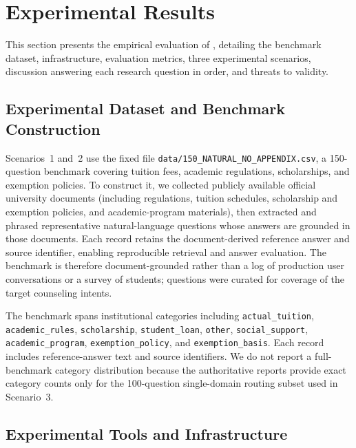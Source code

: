 \section{Experimental Results}
\label{sec:exp}

This section presents the empirical evaluation of \system{}, detailing the benchmark dataset, infrastructure, evaluation metrics, three experimental scenarios, discussion answering each research question in order, and threats to validity.

\subsection{Experimental Dataset and Benchmark Construction}
\label{sec:dataset}

Scenarios~1 and~2 use the fixed file \texttt{data/150\_NATURAL\_NO\_APPENDIX.csv}, a 150-question benchmark covering tuition fees, academic regulations, scholarships, and exemption policies. To construct it, we collected publicly available official university documents (including regulations, tuition schedules, scholarship and exemption policies, and academic-program materials), then extracted and phrased representative natural-language questions whose answers are grounded in those documents. Each record retains the document-derived reference answer and source identifier, enabling reproducible retrieval and answer evaluation. The benchmark is therefore document-grounded rather than a log of production user conversations or a survey of students; questions were curated for coverage of the target counseling intents.

The benchmark spans institutional categories including \texttt{actual\_tuition}, \texttt{academic\_rules}, \texttt{scholarship}, \texttt{student\_loan}, \texttt{other}, \texttt{social\_support}, \texttt{academic\_program}, \texttt{exemption\_policy}, and \texttt{exemption\_basis}. Each record includes reference-answer text and source identifiers. We do not report a full-benchmark category distribution because the authoritative reports provide exact category counts only for the 100-question single-domain routing subset used in Scenario~3.

\subsection{Experimental Tools and Infrastructure}
\label{sec:tools_env}

